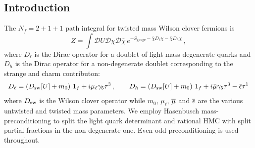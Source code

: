 \documentclass[a0,portrait]{a0poster}
\begin{document}
\begin{multicols}{2}
    \subsection*{Introduction}
    The $N_f =2+1+1$ path integral for twisted mass Wilson clover fermions \cite{Frezzotti:2003ni,Frezzotti:2004wz,Sheikholeslami:1985ij} is
    \begin{equation*}
      Z= \int \mathcal{D}U \mathcal{D}\chi \mathcal{D}\bar\chi \,e^{-S_\mathrm{gauge}-\bar \chi D_\ell\chi - \bar \chi D_h \chi } \,,
    \end{equation*}
    where $D_\ell$ is the Dirac operator for a doublet of light mass-degenerate quarks and $D_h$ is the Dirac operator for a non-degenerate doublet corresponding to the strange and charm contributon:
    \begin{equation*}
        \label{eq:eosw0}
        D_\ell = (D_{\mathrm{sw}}[U] + m_0)\ 1_f + i \mu_\ell\gamma_5\tau^3\, ,\quad\quad
        D_h = (D_{\mathrm{sw}}[U] + m_0)\ 1_f + i\bar\mu\gamma_5\tau^3 - \bar\epsilon \tau^1
    \end{equation*}
    where $D_{\mathrm{sw}}$ is the Wilson clover operator while $m_0$, $\mu_\ell$, $\overline{\mu}$ and $\overline{\epsilon}$ are the various untwisted and twisted mass parameters.
    We employ Hasenbusch mass-preconditioning \cite{Hasenbusch:2001ne} to split the light quark determinant and rational HMC \cite{Clark:2006fx} with split partial fractions in the non-degenerate one. Even-odd preconditioning is used throughout.


\end{multicols}
\end{document}
